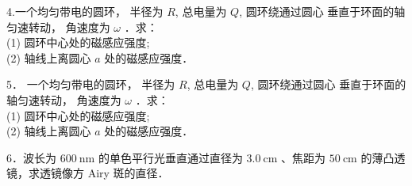 4.一个均匀带电的圆环， 半径为 $R$, 总电量为 $Q$, 圆环绕通过圆心
垂直于环面的轴匀速转动， 角速度为 $\omega$ ．求：\\
(1) 圆环中心处的磁感应强度;\\
(2) 轴线上离圆心 $a$ 处的磁感应强度．

5． 一个均匀带电的圆环， 半径为 $R$, 总电量为 $Q$, 圆环绕通过圆心 垂直于环面的轴匀速转动， 角速度为 $\omega$ ．求：\\
(1) 圆环中心处的磁感应强度;\\
(2) 轴线上离圆心 $a$ 处的磁感应强度．

6．波长为 $600 \mathrm{~nm}$ 的单色平行光垂直通过直径为 $3.0 \mathrm{~cm}$ 、焦距为 $50 \mathrm{~cm}$ 的薄凸透镜，求透镜像方 Airy 斑的直径．